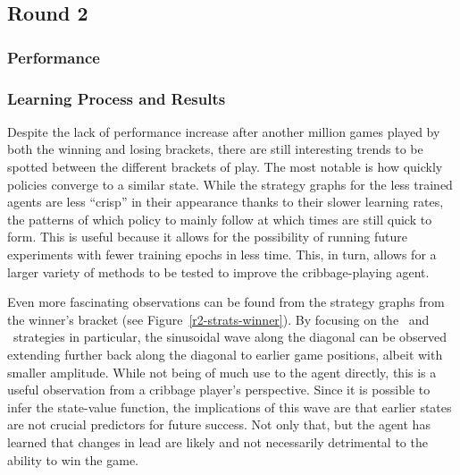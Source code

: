 
\subsection{Round 2}
\label{sec:findings-r2}

\subsubsection*{Performance}
\label{sec:findings-r2-perf}








\subsubsection*{Learning Process and Results}
\label{sec:findings-r2-results}




Despite the lack of performance increase after another million games played by
both the winning and losing brackets,
there are still interesting trends to be spotted between the different brackets
of play.
%
The most notable is how quickly policies converge to a similar state.
%
While the strategy graphs for the less trained agents are less ``crisp''
in their appearance thanks to their slower learning rates,
the patterns of which policy to mainly follow at which times
are still quick to form.
%
This is useful because it allows for the possibility of running future
experiments with fewer training epochs in less time.
%
This, in turn, allows for a larger variety of methods to be tested to improve
the cribbage-playing agent.

Even more fascinating observations can be found from the strategy graphs
from the winner's bracket (see Figure~\ref{r2-strats-winner}).
%
By focusing on the \handmaxmin\ and \handmaxavg\ strategies in particular,
the sinusoidal wave along the diagonal can be observed extending further
back along the diagonal to earlier game positions,
albeit with smaller amplitude.
%
While not being of much use to the agent directly,
this is a useful observation from a cribbage player's perspective.
%
Since it is possible to infer the state-value function,
the implications of this wave are that earlier states are not crucial
predictors for future success.
%
Not only that,
but the agent has learned that changes in lead are likely and not necessarily
detrimental to the ability to win the game.

